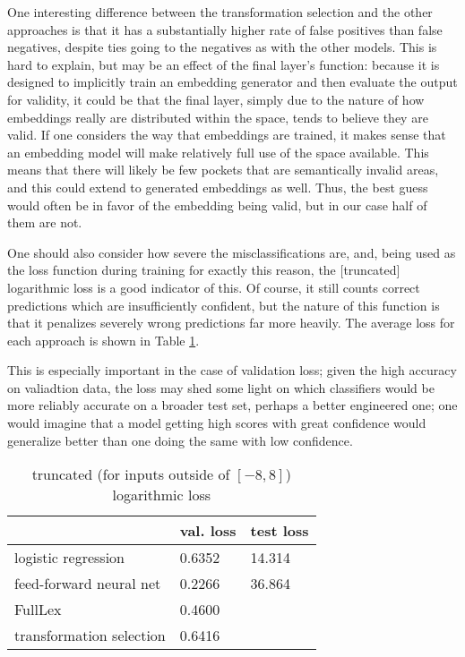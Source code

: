 \documentclass[a4paper, 11pt]{scrartcl}
\begin{document}
One interesting difference between the transformation selection and the other approaches is that it has a substantially higher rate of false positives than false negatives, despite ties going to the negatives as with the other models. This is hard to explain, but may be an effect of the final layer's function: because it is designed to implicitly train an embedding generator and then evaluate the output for validity, it could be that the final layer, simply due to the nature of how embeddings really are distributed within the space, tends to believe they are valid. If one considers the way that embeddings are trained, it makes sense that an embedding model will make relatively full use of the space available. This means that there will likely be few pockets that are semantically invalid areas, and this could extend to generated embeddings as well. Thus, the best guess would often be in favor of the embedding being valid, but in our case half of them are not.

One should also consider how severe the misclassifications are, and, being used as the loss function during training for exactly this reason, the [truncated] logarithmic loss is a good indicator of this. Of course, it still counts correct predictions which are insufficiently confident, but the nature of this function is that it penalizes severely wrong predictions far more heavily. The average loss for each approach is shown in Table \ref{loss-an}.

This is especially important in the case of validation loss; given the high accuracy on valiadtion data, the loss may shed some light on which classifiers would be more reliably accurate on a broader test set, perhaps a better engineered one; one would imagine that a model getting high scores with great confidence would generalize better than one doing the same with low confidence.

\begin{table}[]
	\centering
	\begin{tabular}{l|l|l}
		                         & val. loss & test loss \\ \hline
		logistic regression      & 0.6352    & 14.314    \\
		feed-forward neural net  & 0.2266    & 36.864    \\
		FullLex                  & 0.4600    &           \\
		transformation selection & 0.6416    &          
	\end{tabular}
	\caption{truncated (for inputs outside of $[-8, 8]$) logarithmic loss}
	\label{loss-an}
\end{table}
\end{document}
